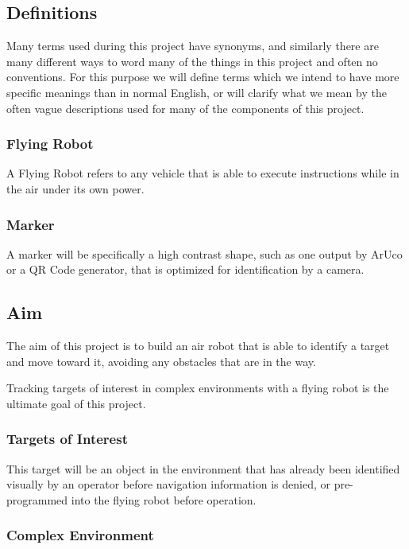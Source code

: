 \documentclass{article}
\begin{document}
	\subsection{Definitions}
	
	Many terms used during this project have synonyms, and similarly there are many different ways to word many of the things in this project and often no conventions. For this purpose we will define terms which we intend to have more specific meanings than in normal English, or will clarify what we mean by the often vague descriptions used for many of the components of this project.
	
		\subsubsection{Flying Robot}
		
		A Flying Robot refers to any vehicle that is able to execute instructions while in the air under its own power.
		
		\subsubsection{Marker}
		
		A marker will be specifically a high contrast shape, such as one output by ArUco or a QR Code generator, that is optimized for identification by a camera.
		
	\subsection{Aim}
	
	The aim of this project is to build an air robot that is able to identify a target and move toward it, avoiding any obstacles that are in the way. 
	
	Tracking targets of interest in complex environments with a flying robot is the ultimate goal of this project. 
	
		\subsubsection{Targets of Interest}
		
		This target will be an object in the environment that has already been identified visually by an operator before navigation information is denied, or pre-programmed into the flying robot before operation.
		
		\subsubsection{Complex Environment}
		
\end{document}

